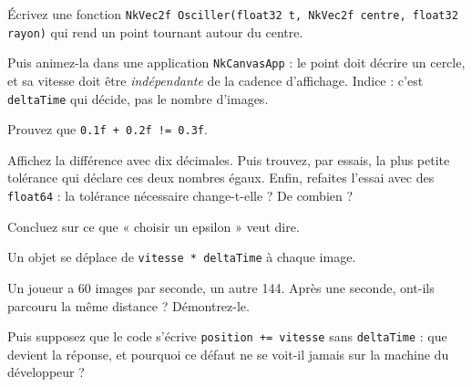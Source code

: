 \begin{nkpratique}
Écrivez une fonction \texttt{NkVec2f Osciller(float32 t, NkVec2f centre, float32
rayon)} qui rend un point tournant autour du centre.

Puis animez-la dans une application \texttt{NkCanvasApp} : le point doit décrire
un cercle, et sa vitesse doit être \emph{indépendante} de la cadence d'affichage.
Indice : c'est \texttt{deltaTime} qui décide, pas le nombre d'images.
\end{nkpratique}

\begin{nkdemo}
Prouvez que \texttt{0.1f + 0.2f != 0.3f}.

Affichez la différence avec dix décimales. Puis trouvez, par essais, la plus
petite tolérance qui déclare ces deux nombres égaux. Enfin, refaites l'essai avec
des \texttt{float64} : la tolérance nécessaire change-t-elle ? De combien ?

Concluez sur ce que « choisir un epsilon » veut dire.
\end{nkdemo}

\begin{nklogique}
Un objet se déplace de \texttt{vitesse * deltaTime} à chaque image.

Un joueur a 60 images par seconde, un autre 144. Après une seconde, ont-ils
parcouru la même distance ? Démontrez-le.

Puis supposez que le code s'écrive \texttt{position += vitesse} sans
\texttt{deltaTime} : que devient la réponse, et pourquoi ce défaut ne se voit-il
jamais sur la machine du développeur ?
\end{nklogique}
